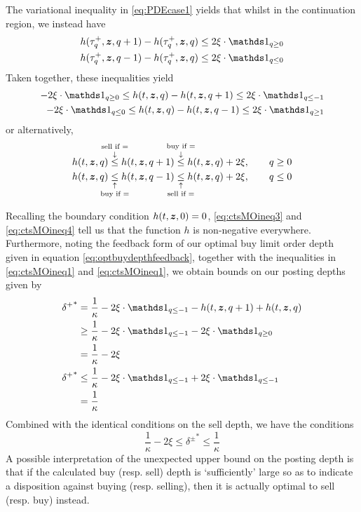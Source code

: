 The variational inequality in \eqref{eq:PDEcase1} yields that whilst in the continuation region, we instead have
\begin{align}
h(\tau^+_q, \bz, q+1) - h(\tau^+_q,\bz,q) & \leq 2 \xi \cdot \indicator_{q \geq 0} \\
h(\tau^+_q, \bz, q-1) - h(\tau^+_q,\bz,q) & \leq 2 \xi \cdot \indicator_{q \leq 0}
\end{align}
Taken together, these inequalities yield
\begin{align}
-2\xi \cdot \indicator_{q \geq 0} \leq h(t,\bz,q) - h(t,\bz,q+1) \leq 2\xi \cdot \indicator_{q \leq -1} \label{eq:ctsMOineq1}\\
-2\xi \cdot \indicator_{q \leq 0} \leq h(t,\bz,q) - h(t,\bz,q-1) \leq 2\xi \cdot \indicator_{q \geq 1} \label{eq:ctsMOineq2}
\end{align}
or alternatively,
\begin{align}
h(t,\bz,q) \overset{\text{\makebox[0pt]{sell if =}}}{\overset{\downarrow}{\leq}} h(t,\bz,q+1) \overset{\text{\makebox[0pt]{buy if =}}}{\overset{\downarrow}{\leq}} h(t,\bz,q) + 2\xi, \qquad q \geq 0 \label{eq:ctsMOineq3}\\
h(t,\bz,q) \underset{\text{\makebox[0pt]{buy if =}}}{\underset{\uparrow}{\leq}} h(t,\bz,q-1) \underset{\text{\makebox[0pt]{sell if =}}}{\underset{\uparrow}{\leq}} h(t,\bz,q) + 2\xi, \qquad q \leq 0 \label{eq:ctsMOineq4}
\end{align}

Recalling the boundary condition $h(t,\bm{z},0) = 0$, \eqref{eq:ctsMOineq3} and \eqref{eq:ctsMOineq4} tell us that the function $h$ is non-negative everywhere. Furthermore, noting the feedback form of our optimal buy limit order depth given in equation \eqref{eq:optbuydepthfeedback}, together with the inequalities in \eqref{eq:ctsMOineq1} and \eqref{eq:ctsMOineq1}, we obtain bounds on our posting depths given by
\begin{align}
{\delta^+}^* & = \frac{1}{\kappa} - 2 \xi \cdot \indicator_{q \leq -1} - h(t,\bz,q+1) + h(t,\bz,q) \\
& \geq \frac{1}{\kappa} - 2 \xi \cdot \indicator_{q \leq -1} - 2 \xi \cdot \indicator_{q \geq 0} \\
& = \frac{1}{\kappa} - 2\xi \\
{\delta^+}^* & \leq \frac{1}{\kappa} - 2 \xi \cdot \indicator_{q \leq -1} + 2 \xi \cdot \indicator_{q \leq -1} \\
& = \frac{1}{\kappa}
\end{align}
Combined with the identical conditions on the sell depth, we have the conditions
\begin{equation}\label{eq:deltaslowerboundcase1}
\boxed{ \frac{1}{\kappa} - 2\xi  \leq {\delta^\pm}^* \leq \frac{1}{\kappa} }
\end{equation}
A possible interpretation of the unexpected upper bound on the posting depth is that if the calculated buy (resp. sell) depth is `sufficiently' large so as to indicate a disposition against buying (resp. selling), then it is actually optimal to sell (resp. buy) instead.